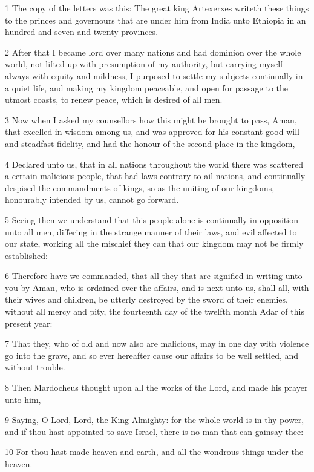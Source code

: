 \par 1 The copy of the letters was this: The great king Artexerxes writeth these things to the princes and governours that are under him from India unto Ethiopia in an hundred and seven and twenty provinces.
\par 2 After that I became lord over many nations and had dominion over the whole world, not lifted up with presumption of my authority, but carrying myself always with equity and mildness, I purposed to settle my subjects continually in a quiet life, and making my kingdom peaceable, and open for passage to the utmost coasts, to renew peace, which is desired of all men.
\par 3 Now when I asked my counsellors how this might be brought to pass, Aman, that excelled in wisdom among us, and was approved for his constant good will and steadfast fidelity, and had the honour of the second place in the kingdom,
\par 4 Declared unto us, that in all nations throughout the world there was scattered a certain malicious people, that had laws contrary to ail nations, and continually despised the commandments of kings, so as the uniting of our kingdoms, honourably intended by us, cannot go forward.
\par 5 Seeing then we understand that this people alone is continually in opposition unto all men, differing in the strange manner of their laws, and evil affected to our state, working all the mischief they can that our kingdom may not be firmly established:
\par 6 Therefore have we commanded, that all they that are signified in writing unto you by Aman, who is ordained over the affairs, and is next unto us, shall all, with their wives and children, be utterly destroyed by the sword of their enemies, without all mercy and pity, the fourteenth day of the twelfth month Adar of this present year:
\par 7 That they, who of old and now also are malicious, may in one day with violence go into the grave, and so ever hereafter cause our affairs to be well settled, and without trouble.
\par 8 Then Mardocheus thought upon all the works of the Lord, and made his prayer unto him,
\par 9 Saying, O Lord, Lord, the King Almighty: for the whole world is in thy power, and if thou hast appointed to save Israel, there is no man that can gainsay thee:
\par 10 For thou hast made heaven and earth, and all the wondrous things under the heaven.
